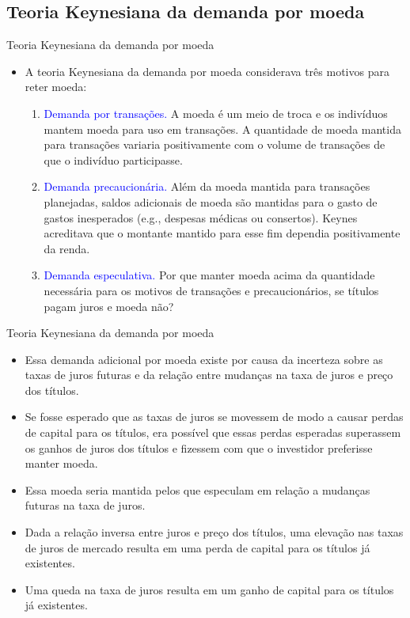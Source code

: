 \documentclass[10pt]{beamer}
\begin{document}
\subsection{Teoria Keynesiana da demanda por moeda}
\begin{frame}{Teoria Keynesiana da demanda por moeda}
    \begin{itemize}
        \item A teoria Keynesiana da demanda por moeda considerava três motivos para reter moeda:
        \bigskip
        \begin{enumerate}
            \item \textcolor{blue}{Demanda por transações.} A moeda é um meio de troca e os indivíduos mantem moeda para uso em transações. A quantidade de moeda mantida para transações variaria positivamente com o volume de transações de que o indivíduo participasse.
            \bigskip
            \item \textcolor{blue}{Demanda precaucionária.} Além da moeda mantida para transações planejadas, saldos adicionais de moeda são mantidas para o gasto de gastos inesperados (e.g., despesas médicas ou consertos). Keynes acreditava que o montante mantido para esse fim dependia positivamente da renda.
            \bigskip
            \item \textcolor{blue}{Demanda especulativa.} Por que manter moeda acima da quantidade necessária para os motivos de transações e precaucionários, se títulos pagam juros e moeda não?
        \end{enumerate}
    \end{itemize}
\end{frame}

\begin{frame}{Teoria Keynesiana da demanda por moeda}
    \begin{itemize}
        \item Essa demanda adicional por moeda existe por causa da incerteza sobre as taxas de juros futuras e da relação entre mudanças na taxa de juros e preço dos títulos.
        \bigskip
        \item Se fosse esperado que as taxas de juros se movessem de modo a causar perdas de capital para os títulos, era possível que essas perdas esperadas superassem os ganhos de juros dos títulos e fizessem com que o investidor preferisse manter moeda.
        \bigskip
        \item Essa moeda seria mantida pelos que especulam em relação a mudanças futuras na taxa de juros.
        \bigskip
        \item Dada a relação inversa entre juros e preço dos títulos, uma elevação nas taxas de juros de mercado resulta em uma perda de capital para os títulos já existentes.
        \bigskip
        \item Uma queda na taxa de juros resulta em um ganho de capital para os títulos já existentes.
    \end{itemize}
\end{frame}
\end{document}

